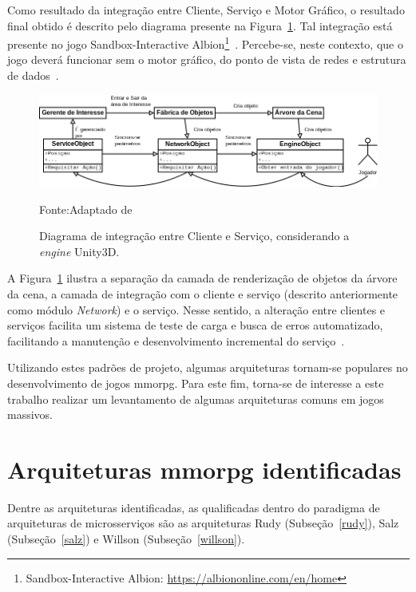 Como resultado da integração entre Cliente, Serviço e Motor Gráfico, o resultado final obtido é descrito pelo diagrama presente na Figura~\ref{fig:integracao_unity_albion}.
%
Tal integração está presente no jogo Sandbox-Interactive Albion\footnote{Sandbox-Interactive Albion: \url{https://albiononline.com/en/home}}~\cite{albion_online_unite}.
%
Percebe-se, neste contexto, que o jogo deverá funcionar sem o motor gráfico, do ponto de vista de redes e estrutura de dados~\cite{albion_online_unite}.


\begin{figure}[htb!]
\caption{Diagrama de integração entre Cliente e Serviço, considerando a \textit{engine} Unity3D.}
\label{fig:integracao_unity_albion}
\includegraphics[width=\textwidth]{img/cap2/integracao_unity_albion.png}
\centering

Fonte:Adaptado de ~\cite{albion_online_unite}
\end{figure}

A Figura~\ref{fig:integracao_unity_albion} ilustra a separação da camada de renderização de objetos da árvore da cena, a camada de integração com o cliente e serviço (descrito anteriormente como módulo \textit{Network}) e o serviço.
%
Nesse sentido, a alteração entre clientes e serviços facilita um sistema de teste de carga e busca de erros automatizado, facilitando a manutenção e desenvolvimento incremental do serviço~\cite{albion_online_unite}.

Utilizando estes padrões de projeto, algumas arquiteturas tornam-se populares no desenvolvimento de jogos \ac{mmorpg}.
%
Para este fim, torna-se de interesse a este trabalho realizar um levantamento de algumas arquiteturas comuns em jogos massivos.



\section{Arquiteturas \ac{mmorpg} identificadas}
\label{cap21}

Dentre as arquiteturas identificadas, as qualificadas dentro do paradigma de arquiteturas de microsserviços são as arquiteturas Rudy (Subseção~\ref{rudy}), Salz (Subseção~\ref{salz}) e Willson (Subseção~\ref{willson}).

